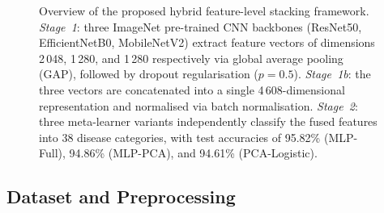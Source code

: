 \documentclass[pdflatex,sn-basic]{sn-jnl}
\begin{document}
\begin{figure}[htbp]
{
}
\caption{Overview of the proposed hybrid feature-level stacking framework.
\textit{Stage~1}: three ImageNet pre-trained CNN backbones (ResNet50,
EfficientNetB0, MobileNetV2) extract feature vectors of dimensions
2\,048, 1\,280, and 1\,280 respectively via global average pooling (GAP),
followed by dropout regularisation ($p = 0.5$).
\textit{Stage~1b}: the three vectors are concatenated into a single
4\,608-dimensional representation and normalised via batch normalisation.
\textit{Stage~2}: three meta-learner variants independently classify the
fused features into 38 disease categories, with test accuracies of
95.82\% (MLP-Full), 94.86\% (MLP-PCA), and 94.61\% (PCA-Logistic).}
\label{fig:architecture}
\end{figure}

\subsection{Dataset and Preprocessing}
\label{subsec:preprocessing}
\end{document}

